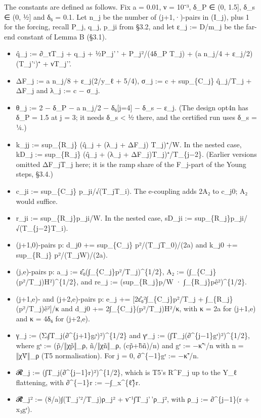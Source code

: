 \documentclass[
]{article}
\providecommand{\tightlist}{%
  \setlength{\itemsep}{0pt}\setlength{\parskip}{0pt}}
\begin{document}
The constants are defined as follows. Fix a = 0.01, ν = 10⁻³, δ\_P ∈ (0,
1.5{]}, δ\_s ∈ (0, ½{]} and δ₆ = 0.1. Let n\_j be the number of
(j+1,·)-pairs in (I\_j), plus 1 for the forcing, recall P\_j, q\_j,
p\_ji from §3.2, and let ε\_j := \textbar D\textbar/m\_j be the far-end
constant of Lemma B (§3.1).

\begin{itemize}
\tightlist
\item
  q̂\_j := ∂\_τT\_j + q\_j + ½P\_j'\,' + P\_j²/(4δ\_P T\_j) + (a n\_j/4 +
  ε\_j/2)(T\_j'`)⁺ + ν\textbar T\_j''\textbar.
\item
  ΔF\_j := a n\_j/8 + ε\_j(2/y\_ℓ + 5/4), σ\_j := c + sup\_\{C\_j\}
  q̂\_j/T\_j + ΔF\_j and λ\_j := c − σ\_j.
\item
  θ\_j := 2 − δ\_P − a n\_j/2 − δ₆{[}j=4{]} − δ\_s − ε\_j. (The design
  opt4n has δ\_P = 1.5 at j = 3; it needs δ\_s \textless{} ½ there, and
  the certified run uses δ\_s = ¼.)
\item
  k\_jj := sup\_\{R\_j\} (q̂\_j + (λ\_j + ΔF\_j) T\_j)⁺/W. In the nested
  case, kD\_j := sup\_\{R\_j\} (q̂\_j + (λ\_j + ΔF\_j)T\_j)⁺/T\_\{j−2\}.
  (Earlier versions omitted ΔF\_jT\_j here; it is the ramp share of the
  F\_j-part of the Young steps, §3.4.)
\item
  c\_ji := sup\_\{C\_j\} \textbar p\_ji\textbar/√(T\_jT\_i). The
  e-coupling adds 2A₂ to c\_j0; A₂ would suffice.
\item
  r\_ji := sup\_\{R\_j\}\textbar p\_ji\textbar/W. In the nested case,
  sD\_ji := sup\_\{R\_j\}\textbar p\_ji\textbar/√(T\_\{j−2\}T\_i).
\item
  (j+1,0)-pairs p: d\_j0 += sup\_\{C\_j\} p²/(T\_jT\_0)/(2a) and k\_j0
  += sup\_\{R\_j\} p²/(T\_jW)/(2a).
\item
  (j,e)-pairs p: a\_j := ε̂₀(∫\_\{C\_j\}p²/T\_j)\^{}\{1/2\}, A₂ :=
  (∫\_\{C\_j\}(p²/T\_j)H²)\^{}\{1/2\}, and re\_j :=
  (sup\_\{R\_j\}\textbar p\textbar/W ·
  ∫\_\{R\_j\}\textbar p\textbar ê²)\^{}\{1/2\}.
\item
  (j+1,e)- and (j+2,e)-pairs p: e\_j += {[}2ε̂₀²∫\_\{C\_j\}p²/T\_j +
  ∫\_\{R\_j\}(p²/T\_j)ê²{]}/κ and d\_j0 += 2∫\_\{C\_j\}(p²/T\_j)H²/κ,
  with κ = 2a for (j+1,e) and κ = 4δ₆ for (j+2,e).
\item
  γ\_j := (Σᵢ∫T\_j(∂\^{}\{j+1\}gᵢˢ)²)\^{}\{1/2\} and γʳ\_j :=
  (∫T\_j(∂\^{}\{j−1\}gʳ)²)\^{}\{1/2\}, where gˢ := (p̃/‖χp̃‖\_ρ,
  ñ/‖χñ‖\_ρ, (cp̃+b̃ñ)/n) and gʳ := −κ̃'`/n with n = ‖χṼ‖\_ρ (T5
  normalisation). For j = 0, ∂\^{}\{−1\}gʳ := −κ̃'/n.
\item
  𝓡\_j := (∫T\_j(∂\^{}\{j−1\}r)²)\^{}\{1/2\}, which is T5's R\^{}F\_j up
  to the Y\_ℓ flattening, with ∂\^{}\{−1\}r := −∫\_x\^{}\{ℓ̃\}r.
\item
  𝓡̂\_j² := (8/a)∫(T\_j'²/T\_j)ρ\_j² +
  ν⁻¹∫\textbar T\_j'\,'\textbar ρ\_j², with ρ\_j := ∂\^{}\{j−1\}(r +
  x₃gʳ).
\end{itemize}
\end{document}
